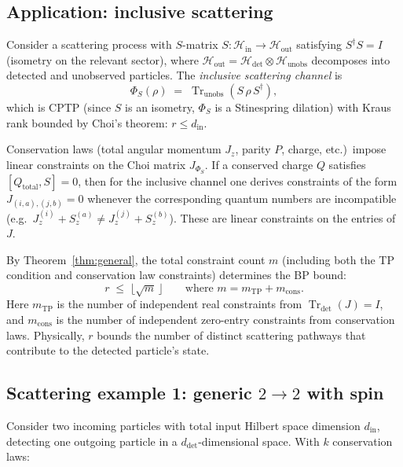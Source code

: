 \documentclass[11pt,a4paper]{article}
\theoremstyle{definition}
\newcommand{\Tr}{\operatorname{Tr}}
\begin{document}
\subsection{Application: inclusive scattering}
\label{sec:scattering-channel}

Consider a scattering process with $S$-matrix
$S \colon \mathcal{H}_{\mathrm{in}} \to
\mathcal{H}_{\mathrm{out}}$ satisfying $S^\dagger S = I$ (isometry
on the relevant sector), where $\mathcal{H}_{\mathrm{out}} =
\mathcal{H}_{\mathrm{det}} \otimes \mathcal{H}_{\mathrm{unobs}}$
decomposes into detected and unobserved particles.  The \emph{inclusive
scattering channel} is
\[
  \Phi_S(\rho)
  \;=\; \Tr_{\mathrm{unobs}}(S\, \rho\, S^\dagger),
\]
which is CPTP (since $S$ is an isometry, $\Phi_S$ is a Stinespring
dilation) with Kraus rank bounded by Choi's theorem:
$r \leq d_{\mathrm{in}}$.

Conservation laws (total angular momentum $J_z$, parity $P$, charge,
etc.)\ impose linear constraints on the Choi matrix $J_{\Phi_S}$.
If a conserved charge $Q$ satisfies $[Q_{\mathrm{total}}, S] = 0$,
then for the inclusive channel one derives constraints of the form
$J_{(i,a),(j,b)} = 0$ whenever the corresponding quantum numbers
are incompatible (e.g.\ $J_z^{(i)} + S_z^{(a)} \neq
J_z^{(j)} + S_z^{(b)}$).  These are linear constraints on the
entries of $J$.

By Theorem~\ref{thm:general}, the total constraint count $m$
(including both the TP condition and conservation law constraints)
determines the BP bound:
\[
  r \;\leq\; \bigl\lfloor\sqrt{m}\,\bigr\rfloor
  \qquad \text{where } m = m_{\mathrm{TP}} + m_{\mathrm{cons}}.
\]
Here $m_{\mathrm{TP}}$ is the number of independent real
constraints from $\Tr_{\mathrm{det}}(J) = I$, and
$m_{\mathrm{cons}}$ is the number of independent zero-entry
constraints from conservation laws.  Physically, $r$ bounds the
number of distinct scattering pathways that contribute to the
detected particle's state.

\subsection{Scattering example 1: generic $2 \to 2$ with spin}
\label{sec:scatter-generic}

Consider two incoming particles with total input Hilbert space
dimension $d_{\mathrm{in}}$, detecting one outgoing particle in a
$d_{\mathrm{det}}$-dimensional space.  With $k$ conservation laws:
\end{document}
